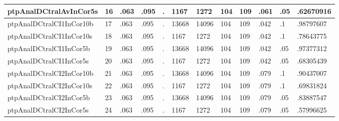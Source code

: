 \begin{tabular}{|l|l|l|l|l|l|l|l|l|l|l|l|}
ptpAnalDCtralAvInCor5s & 16 & .063 & .095 & . & 1167 & 1272 & 104 & 109 & .061 & .05 & .62670916 \\ \hline 
ptpAnalDCtralCI1InCor10b & 17 & .063 & .095 & . & 13668 & 14096 & 104 & 109 & .042 & .1 & .98797607 \\ \hline 
ptpAnalDCtralCI1InCor10s & 18 & .063 & .095 & . & 1167 & 1272 & 104 & 109 & .042 & .1 & .78643775 \\ \hline 
ptpAnalDCtralCI1InCor5b & 19 & .063 & .095 & . & 13668 & 14096 & 104 & 109 & .042 & .05 & .97377312 \\ \hline 
ptpAnalDCtralCI1InCor5s & 20 & .063 & .095 & . & 1167 & 1272 & 104 & 109 & .042 & .05 & .68305439 \\ \hline 
ptpAnalDCtralCI2InCor10b & 21 & .063 & .095 & . & 13668 & 14096 & 104 & 109 & .079 & .1 & .90437007 \\ \hline 
ptpAnalDCtralCI2InCor10s & 22 & .063 & .095 & . & 1167 & 1272 & 104 & 109 & .079 & .1 & .69831824 \\ \hline 
ptpAnalDCtralCI2InCor5b & 23 & .063 & .095 & . & 13668 & 14096 & 104 & 109 & .079 & .05 & .83887547 \\ \hline 
ptpAnalDCtralCI2InCor5s & 24 & .063 & .095 & . & 1167 & 1272 & 104 & 109 & .079 & .05 & .57996625 \\ \hline 
  \end{tabular}
